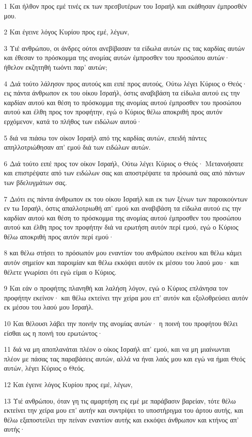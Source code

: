 \par 1 Και ήλθον προς εμέ τινές εκ των πρεσβυτέρων του Ισραήλ και εκάθησαν έμπροσθέν μου.
\par 2 Και έγεινε λόγος Κυρίου προς εμέ, λέγων,
\par 3 Υιέ ανθρώπου, οι άνδρες ούτοι ανεβίβασαν τα είδωλα αυτών εις τας καρδίας αυτών και έθεσαν το πρόσκομμα της ανομίας αυτών έμπροσθεν του προσώπου αυτών· ήθελον εκζητηθή τωόντι παρ' αυτών;
\par 4 Διά τούτο λάλησον προς αυτούς και ειπέ προς αυτούς, Ούτω λέγει Κύριος ο Θεός· εις πάντα άνθρωπον εκ του οίκου Ισραήλ, όστις αναβιβάση τα είδωλα αυτού εις την καρδίαν αυτού και θέση το πρόσκομμα της ανομίας αυτού έμπροσθεν του προσώπου αυτού και έλθη προς τον προφήτην, εγώ ο Κύριος θέλω αποκριθή προς αυτόν ερχόμενον, κατά το πλήθος των ειδώλων αυτού·
\par 5 διά να πιάσω τον οίκον Ισραήλ από της καρδίας αυτών, επειδή πάντες απηλλοτριώθησαν απ' εμού διά των ειδώλων αυτών.
\par 6 Διά τούτο ειπέ προς τον οίκον Ισραήλ, Ούτω λέγει Κύριος ο Θεός· Μετανοήσατε και επιστρέψατε από των ειδώλων σας και αποστρέψατε τα πρόσωπά σας από πάντων των βδελυγμάτων σας.
\par 7 Διότι εις πάντα άνθρωπον εκ του οίκου Ισραήλ και εκ των ξένων των παροικούντων εν τω Ισραήλ, όστις απαλλοτριωθή απ' εμού και αναβιβάση τα είδωλα αυτού εις την καρδίαν αυτού και θέση το πρόσκομμα της ανομίας αυτού έμπροσθεν του προσώπου αυτού και έλθη προς τον προφήτην διά να ερωτήση αυτόν περί εμού, εγώ ο Κύριος θέλω αποκριθή προς αυτόν περί εμού·
\par 8 και θέλω στήσει το πρόσωπόν μου εναντίον του ανθρώπου εκείνου και θέλω κάμει αυτόν σημείον και παροιμίαν και θέλω εκκόψει αυτόν εκ μέσου του λαού μου· και θέλετε γνωρίσει ότι εγώ είμαι ο Κύριος.
\par 9 Και εάν ο προφήτης πλανηθή και λαλήση λόγον, εγώ ο Κύριος επλάνησα τον προφήτην εκείνον· και θέλω εκτείνει την χείρα μου επ' αυτόν και εξολοθρεύσει αυτόν εκ μέσου του λαού μου Ισραήλ.
\par 10 Και θέλουσι λάβει την ποινήν της ανομίας αυτών· η ποινή του προφήτου θέλει είσθαι ως η ποινή του ερωτώντος·
\par 11 διά να μη αποπλανάται πλέον ο οίκος Ισραήλ απ' εμού, και να μη μιαίνωνται πλέον με πάσας τας παραβάσεις αυτών, αλλά να ήναι λαός μου και εγώ να ήμαι Θεός αυτών, λέγει Κύριος ο Θεός.
\par 12 Και έγεινε λόγος Κυρίου προς εμέ, λέγων,
\par 13 Υιέ ανθρώπου, όταν γη τις αμαρτήση εις εμέ με παράβασιν βαρείαν, τότε θέλω εκτείνει την χείρα μου επ' αυτήν και συντρίψει το υποστήριγμα του άρτου αυτής, και θέλω εξαποστείλει την πείναν εναντίον αυτής και εκκόψει άνθρωπον και κτήνος απ' αυτής·
